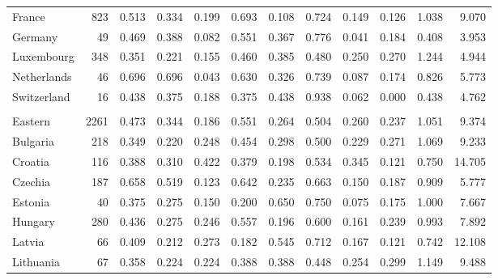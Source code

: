 \begin{tabular}{lrrrrrrrrrrr}
  \hspace{10mm} France &  823 & 0.513 & 0.334 & 0.199 & 0.693 & 0.108 & 0.724 & 0.149 & 0.126 & 1.038 & 9.070 \\ 
  \hspace{10mm} Germany &   49 & 0.469 & 0.388 & 0.082 & 0.551 & 0.367 & 0.776 & 0.041 & 0.184 & 0.408 & 3.953 \\ 
  \hspace{10mm} Luxembourg &  348 & 0.351 & 0.221 & 0.155 & 0.460 & 0.385 & 0.480 & 0.250 & 0.270 & 1.244 & 4.944 \\ 
  \hspace{10mm} Netherlands &   46 & 0.696 & 0.696 & 0.043 & 0.630 & 0.326 & 0.739 & 0.087 & 0.174 & 0.826 & 5.773 \\ 
  \hspace{10mm} Switzerland &   16 & 0.438 & 0.375 & 0.188 & 0.375 & 0.438 & 0.938 & 0.062 & 0.000 & 0.438 & 4.762 \\ 
  \multicolumn{10}{l}{\phantom{empty}} \\
        \hspace{5mm} Eastern & 2261 & 0.473 & 0.344 & 0.186 & 0.551 & 0.264 & 0.504 & 0.260 & 0.237 & 1.051 & 9.374 \\ 
  \hspace{10mm} Bulgaria &  218 & 0.349 & 0.220 & 0.248 & 0.454 & 0.298 & 0.500 & 0.229 & 0.271 & 1.069 & 9.233 \\ 
  \hspace{10mm} Croatia &  116 & 0.388 & 0.310 & 0.422 & 0.379 & 0.198 & 0.534 & 0.345 & 0.121 & 0.750 & 14.705 \\ 
  \hspace{10mm} Czechia &  187 & 0.658 & 0.519 & 0.123 & 0.642 & 0.235 & 0.663 & 0.150 & 0.187 & 0.909 & 5.777 \\ 
  \hspace{10mm} Estonia &   40 & 0.375 & 0.275 & 0.150 & 0.200 & 0.650 & 0.750 & 0.075 & 0.175 & 1.000 & 7.667 \\ 
  \hspace{10mm} Hungary &  280 & 0.436 & 0.275 & 0.246 & 0.557 & 0.196 & 0.600 & 0.161 & 0.239 & 0.993 & 7.892 \\ 
  \hspace{10mm} Latvia &   66 & 0.409 & 0.212 & 0.273 & 0.182 & 0.545 & 0.712 & 0.167 & 0.121 & 0.742 & 12.108 \\ 
  \hspace{10mm} Lithuania &   67 & 0.358 & 0.224 & 0.224 & 0.388 & 0.388 & 0.448 & 0.254 & 0.299 & 1.149 & 9.488 \\ 

\end{tabular}
